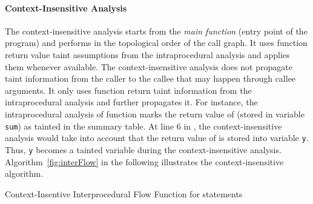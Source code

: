 \paragraph{Context-Insensitive Analysis}
The context-insensitive analysis starts from the \textit{main function}
(entry point of the program) and performs in the topological order
of the call graph. It uses function return value taint assumptions
from the intraprocedural analysis and applies them whenever available.
The context-insensitive analysis does not propagate taint information
from the caller to the callee that may happen through callee arguments.
It only uses function return taint information from the intraprocedural
analysis  and further propagates it.
For instance, the intraprocedural analysis of function \main{}
marks the return value of \compute (stored in variable \texttt{sum})
as tainted in the summary table. At line $6$ in \main, the context-insensitive
analysis  would take into account that the return value of \compute is
stored into variable \texttt{y}. Thus, \texttt{y} becomes a
tainted variable during the context-insensitive analysis.
Algorithm~\ref{fig:interFlow} in the following
illustrates the context-insensitive algorithm.
\begin{algorithm}[!htbp]
\caption{Context-Insentive Interprocedural Flow Function for \callt
statements}\label{fig:interFlow}
\LinesNumbered
\DontPrintSemicolon
{}

\OutData{}
\end{algorithm}


